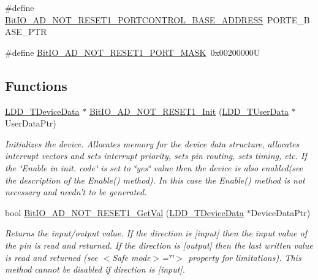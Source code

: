 \begin{DoxyCompactItemize}
\item 
\#define \hyperlink{group___bit_i_o___a_d___n_o_t___r_e_s_e_t1__module_gacea4bd778ca52f1a367eb1821ecc4834}{Bit\-I\-O\-\_\-\-A\-D\-\_\-\-N\-O\-T\-\_\-\-R\-E\-S\-E\-T1\-\_\-\-P\-O\-R\-T\-C\-O\-N\-T\-R\-O\-L\-\_\-\-B\-A\-S\-E\-\_\-\-A\-D\-D\-R\-E\-S\-S}~P\-O\-R\-T\-E\-\_\-\-B\-A\-S\-E\-\_\-\-P\-T\-R
\item 
\#define \hyperlink{group___bit_i_o___a_d___n_o_t___r_e_s_e_t1__module_gad71cc06004b1b25ab2d08164db0d4e03}{Bit\-I\-O\-\_\-\-A\-D\-\_\-\-N\-O\-T\-\_\-\-R\-E\-S\-E\-T1\-\_\-\-P\-O\-R\-T\-\_\-\-M\-A\-S\-K}~0x00200000\-U
\end{DoxyCompactItemize}
\subsection*{Functions}
\begin{DoxyCompactItemize}
\item 
\hyperlink{group___p_e___types__module_gac5cf1362f1f0e3a2ce71b1bf2276d091}{L\-D\-D\-\_\-\-T\-Device\-Data} $\ast$ \hyperlink{group___bit_i_o___a_d___n_o_t___r_e_s_e_t1__module_gab7895fb466d4733d904fc3e8494eb986}{Bit\-I\-O\-\_\-\-A\-D\-\_\-\-N\-O\-T\-\_\-\-R\-E\-S\-E\-T1\-\_\-\-Init} (\hyperlink{group___p_e___types__module_ga0b66a73f87238a782318aa0be7578e35}{L\-D\-D\-\_\-\-T\-User\-Data} $\ast$User\-Data\-Ptr)
\begin{DoxyCompactList}\small\item\em Initializes the device. Allocates memory for the device data structure, allocates interrupt vectors and sets interrupt priority, sets pin routing, sets timing, etc. If the \char`\"{}\-Enable
    in init. code\char`\"{} is set to \char`\"{}yes\char`\"{} value then the device is also enabled(see the description of the Enable() method). In this case the Enable() method is not necessary and needn't to be generated. \end{DoxyCompactList}\item 
bool \hyperlink{group___bit_i_o___a_d___n_o_t___r_e_s_e_t1__module_gae70d3f55ba2a5e7aced140db02d32535}{Bit\-I\-O\-\_\-\-A\-D\-\_\-\-N\-O\-T\-\_\-\-R\-E\-S\-E\-T1\-\_\-\-Get\-Val} (\hyperlink{group___p_e___types__module_gac5cf1362f1f0e3a2ce71b1bf2276d091}{L\-D\-D\-\_\-\-T\-Device\-Data} $\ast$Device\-Data\-Ptr)
\begin{DoxyCompactList}\small\item\em Returns the input/output value. If the direction is \mbox{[}input\mbox{]} then the input value of the pin is read and returned. If the direction is \mbox{[}output\mbox{]} then the last written value is read and returned (see $<$\-Safe mode$>$=\char`\"{}\char`\"{}$>$ property for limitations). This method cannot be disabled if direction is \mbox{[}input\mbox{]}. \end{DoxyCompactList}\item 

\end{DoxyCompactItemize}
